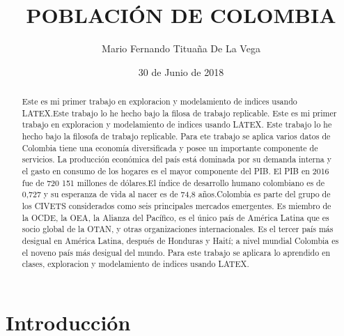 \documentclass{article}
\title{POBLACIÓN DE COLOMBIA}
\author[1]{\normalsize Mario Fernando Titua\~na De La Vega}
\affil[1]{\small  Escuela de Ingeniería,Universidad de los Andes\\
\texttt{{mf.tituana}@uniandes.edu.co}}
\date{30 de Junio de 2018}
\begin{document}

\maketitle
\begin{abstract}

Este es mi primer trabajo en exploracion y modelamiento de indices usando LATEX.Este trabajo lo he hecho bajo la filosa de trabajo replicable. Este es mi primer trabajo en exploracion y modelamiento de indices usando LATEX. Este trabajo lo he hecho bajo la filosofa de trabajo replicable. Para ete trabajo se aplica varios datos de Colombia tiene una economía diversificada y posee un importante componente de servicios. La producción económica del país está dominada por su demanda interna y el gasto en consumo de los hogares es el mayor componente del PIB. El PIB en 2016 fue de 720 151 millones de dólares.El índice de desarrollo humano colombiano es de 0,727 y su esperanza de vida al nacer es de 74,8 años.Colombia es parte del grupo de los CIVETS considerados como seis principales mercados emergentes. Es miembro de la OCDE, la OEA, la Alianza del Pacífico, es el único país de América Latina que es socio global de la OTAN, y otras organizaciones internacionales. Es el tercer país más desigual en América Latina, después de Honduras y Haití; a nivel mundial Colombia es el noveno país más desigual del mundo. Para este trabajo se aplicara lo aprendido en clases, exploracion y modelamiento de indices usando LATEX. 
\end{abstract}
\section*{Introducción}
\end{document}
